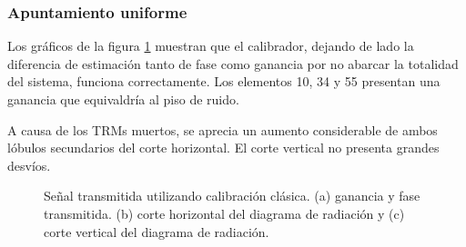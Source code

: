 \subsubsection{Apuntamiento uniforme}

Los gráficos de la figura \ref{fig:deadTRMsClassical0deg} muestran que el calibrador, dejando de lado la diferencia de 
estimación tanto de fase como ganancia por no abarcar la totalidad del sistema, funciona correctamente. Los elementos 10, 34 y 
55 presentan una ganancia que equivaldría al piso de ruido.

A causa de los TRMs muertos, se aprecia un aumento considerable de ambos lóbulos secundarios del corte horizontal. El corte 
vertical no presenta grandes desvíos.

\begin{figure}[H]
	\centering

	\caption{Señal transmitida utilizando calibración clásica. (a) ganancia y fase transmitida. (b) corte horizontal del 
	diagrama de radiación y (c) corte vertical del diagrama de radiación.}
	\label{fig:deadTRMsClassical0deg}
\end{figure}

